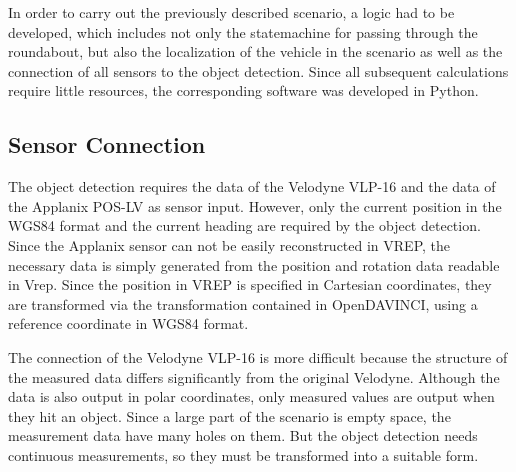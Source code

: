 \documentclass[11pt,oneside,openright]{mpreport}
\begin{document}

In order to carry out the previously described scenario, a logic had to be developed, which includes not only the statemachine for passing through the roundabout,
but also the localization of the vehicle in the scenario as well as the connection of all sensors to the object detection.
Since all subsequent calculations require little resources, the corresponding software was developed in Python.

\subsection{Sensor Connection}
The object detection requires the data of the Velodyne VLP-16 and the data of the Applanix POS-LV as sensor input.
However, only the current position in the WGS84 format and the current heading are required by the object detection.
Since the Applanix sensor can not be easily reconstructed in VREP, the necessary data is simply generated from the position and rotation data readable in Vrep.
Since the position in VREP is specified in Cartesian coordinates, they are transformed via the transformation contained in OpenDAVINCI, using a reference coordinate in WGS84 format.

The connection of the Velodyne VLP-16 is more difficult because the structure of the measured data differs significantly from the original Velodyne.
Although the data is also output in polar coordinates, only measured values are output when they hit an object. Since a large part of the scenario is empty space,
the measurement data have many holes on them. But the object detection needs continuous measurements, so they must be transformed into a suitable form.
\end{document}
